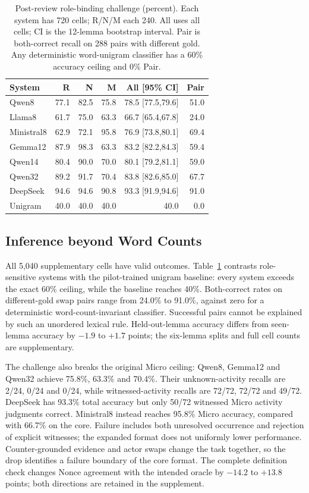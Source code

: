 \documentclass[sigconf,anonymous,review]{acmart}
\begin{document}
\begin{table}[t]
\centering
\caption{Post-review role-binding challenge (percent). Each system has 720 cells; R/N/M each 240. All uses all cells; CI is the 12-lemma bootstrap interval. Pair is both-correct recall on 288 pairs with different gold. Any deterministic word-unigram classifier has a 60\% accuracy ceiling and 0\% Pair.}
\label{tab:binding}
\setlength{\tabcolsep}{2.5pt}
\begin{tabular}{lrrrrr}
\toprule
System & R & N & M & All [95\% CI] & Pair\\
\midrule
Qwen8 & 77.1 & 82.5 & 75.8 & 78.5 [77.5,79.6] & 51.0 \\
Llama8 & 61.7 & 75.0 & 63.3 & 66.7 [65.4,67.8] & 24.0 \\
Ministral8 & 62.9 & 72.1 & 95.8 & 76.9 [73.8,80.1] & 69.4 \\
Gemma12 & 87.9 & 98.3 & 63.3 & 83.2 [82.2,84.3] & 59.4 \\
Qwen14 & 80.4 & 90.0 & 70.0 & 80.1 [79.2,81.1] & 59.0 \\
Qwen32 & 89.2 & 91.7 & 70.4 & 83.8 [82.6,85.0] & 67.7 \\
DeepSeek & 94.6 & 94.6 & 90.8 & 93.3 [91.9,94.6] & 91.0 \\
Unigram & 40.0 & 40.0 & 40.0 & 40.0 & 0.0 \\
\bottomrule
\end{tabular}
\end{table}

\subsection{Inference beyond Word Counts}
All 5,040 supplementary cells have valid outcomes. Table~\ref{tab:binding} contrasts role-sensitive systems with the pilot-trained unigram baseline: every system exceeds the exact 60\% ceiling, while the baseline reaches 40\%. Both-correct rates on different-gold swap pairs range from 24.0\% to 91.0\%, against zero for a deterministic word-count-invariant classifier. Successful pairs cannot be explained by such an unordered lexical rule. Held-out-lemma accuracy differs from seen-lemma accuracy by $-1.9$ to $+1.7$ points; the six-lemma splits and full cell counts are supplementary.

The challenge also breaks the original Micro ceiling: Qwen8, Gemma12 and Qwen32 achieve 75.8\%, 63.3\% and 70.4\%. Their unknown-activity recalls are 2/24, 0/24 and 0/24, while witnessed-activity recalls are 72/72, 72/72 and 49/72. DeepSeek has 93.3\% total accuracy but only 50/72 witnessed Micro activity judgments correct. Ministral8 instead reaches 95.8\% Micro accuracy, compared with 66.7\% on the core. Failure includes both unresolved occurrence and rejection of explicit witnesses; the expanded format does not uniformly lower performance. Counter-grounded evidence and actor swaps change the task together, so the drop identifies a failure boundary of the core format. The complete definition check changes Nonce agreement with the intended oracle by $-14.2$ to $+13.8$ points; both directions are retained in the supplement.
\end{document}
